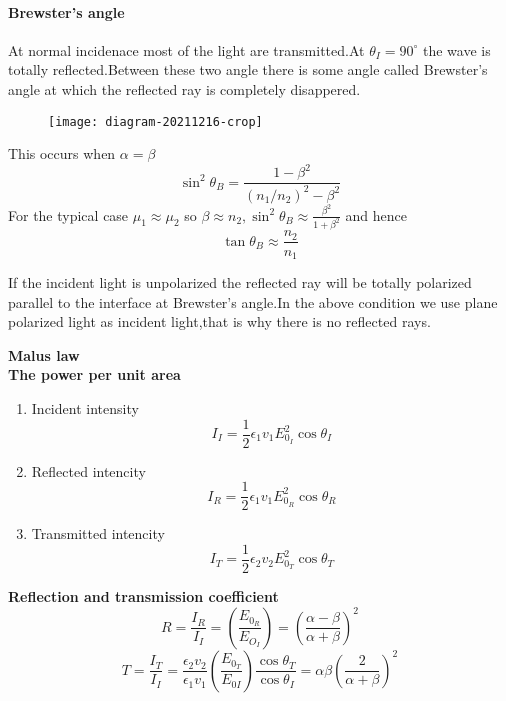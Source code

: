 \paragraph{Brewster's angle}
At normal incidenace most of the light are transmitted.At $\theta_I=90^{\circ}$ the wave is totally reflected.Between these two angle there is some angle called Brewster's angle at which the reflected ray is completely disappered.\\
\begin{figure}[H]
	\centering
	\texttt{[image: diagram-20211216-crop]}
	\caption{}
	\label{}
\end{figure}
This occurs when $\alpha=\beta$\\
$$\sin ^{2} \theta_{B}=\frac{1-\beta^{2}}{\left(n_{1} / n_{2}\right)^{2}-\beta^{2}}$$
For the typical case $\mu_{1}\approx\mu_{2}$ so $\beta \approx n_2, \sin^2 \theta_{B}\approx \frac{\beta^2}{1+\beta^2}$ and hence\\
$$\tan \theta_{B} \approx \frac{n_2}{n_1}$$
\begin{note}
	If the incident light is unpolarized the reflected ray will be totally polarized parallel to the interface at Brewster's angle.In the above condition we use plane polarized light as incident light,that is why there is no reflected rays.
\end{note}
\textbf{ Malus law }\\
	\textbf{The power per unit area}
\begin{note}
	\begin{enumerate}
		\item Incident intensity\\
		$$I_I=\frac{1}{2}\epsilon_{1}v_1E_{0_I}^2 \cos \theta_{I}$$
		\item Reflected intencity
		$$I_R=\frac{1}{2}\epsilon_{1}v_1E_{0_R}^2 \cos \theta_{R}$$
		\item Transmitted intencity
		$$I_T=\frac{1}{2}\epsilon_{2}v_2E_{0_T}^2 \cos \theta_{T}$$
	\end{enumerate}
\end{note}
\textbf{Reflection and transmission coefficient}
$$R=\frac{I_R}{I_I}=\left( \frac{E_{0_R}}{E_{O_I}}\right) =\left( \frac{\alpha-\beta}{\alpha+\beta}\right) ^2$$
$$T=\frac{I_T}{I_I}=\frac{\epsilon_{2}v_2}{\epsilon_{1}v_1}\left( \frac{E_{0_T}}{E_{0I}}\right) \frac{\cos \theta_{T}}{\cos \theta_{I}}=\alpha \beta\left( \frac{2}{\alpha+\beta} \right) ^2$$
